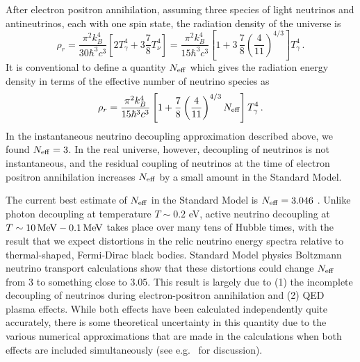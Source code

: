 After electron positron annihilation, assuming three species of light neutrinos and antineutrinos, each with one spin state, the radiation density of the universe is
\begin{equation}
	\rho_r = \frac{\pi^2k_B^4}{30\hbar^3 c^3}\left[2T_\gamma^4 + 3\frac{7}{8}T_\nu^4\right] = \frac{\pi^2k_B^4}{15\hbar^3 c^3}\left[1+3\,\frac{7}{8}\left(\frac{4}{11}\right)^{4/3}\right] T_\gamma^4 \, .
\end{equation}
It is conventional to define a quantity $N_{\rm eff}$ which gives the radiation energy density in terms of the effective number of neutrino species as
\begin{equation}
	\rho_r = \frac{\pi^2k_B^4}{15\hbar^3 c^3}\left[1+\frac{7}{8}\left(\frac{4}{11}\right)^{4/3}N_{\rm eff}\right] T_\gamma^4 \, .
\end{equation}
In the instantaneous neutrino decoupling approximation described above, we found $N_{\rm eff} = 3$.  In the real universe, however, decoupling of neutrinos is not instantaneous, and the residual coupling of neutrinos at the time of electron positron annihilation increases $N_{\rm eff}$ by a small amount in the Standard Model.

The current best estimate of $N_{\rm eff}$ in the Standard Model is $N_{\rm eff} = 3.046$ \cite{Mangano:2005cc}.   Unlike photon decoupling at temperature $T \sim 0.2$ eV, active neutrino decoupling at $T \sim 10 \, {\rm MeV} - 0.1 \, {\rm MeV}$ takes place over many tens of Hubble times, with the result that we expect distortions in the relic neutrino energy spectra relative to thermal-shaped, Fermi-Dirac black bodies. Standard Model physics Boltzmann neutrino transport calculations show that these distortions could change $N_{\rm eff}$ from 3 to something close to 3.05. This result is largely due to (1) the incomplete decoupling of neutrinos during electron-positron annihilation and (2) QED plasma effects.  While both effects have been calculated independently quite accurately, there is some theoretical uncertainty in this quantity due to the various numerical approximations that are made in the calculations when both effects are included simultaneously (see e.g.~\cite{Grohs:2015tfy} for discussion).  



